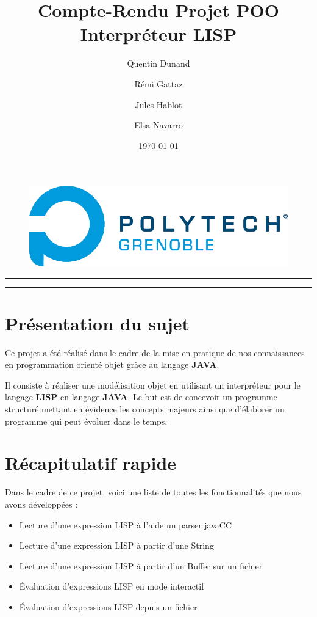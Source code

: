 \documentclass[a4paper, 11pt]{article}
\title {\Huge Compte-Rendu Projet POO \\ Interpréteur LISP}
\author{Quentin Dunand \and Rémi Gattaz \and Jules Hablot \and Elsa Navarro}
\date{\today}
\numberwithin{equation}{section}
\theoremstyle{definition}
\begin{document}
\maketitle	

\vspace*{3cm}

\begin{figure}[!hcb]
	\includegraphics[scale=2.7]{Illustration/Logo_polytech}
\end{figure}

\clearpage

\hrule
\tableofcontents
\vspace*{5mm}
\hrule

\newpage


\section{Présentation du sujet}

Ce projet a été réalisé dans le cadre de la mise en pratique de nos connaissances en programmation orienté objet grâce au langage {\bfseries JAVA}.

Il consiste à réaliser une modélisation objet en utilisant un interpréteur pour le langage {\bfseries LISP} en langage {\bfseries JAVA}. Le but est de concevoir un programme structuré mettant en évidence les concepts majeurs ainsi que d'élaborer un programme qui peut évoluer dans le temps.

  
\section{Récapitulatif rapide}

Dans le cadre de ce projet, voici une liste de toutes les fonctionnalités que nous avons développées :
\begin{itemize}
	\item Lecture d'une expression LISP à l'aide un parser javaCC
	\item Lecture d'une expression LISP à partir d'une String
	\item Lecture d'une expression LISP à partir d'un Buffer sur un fichier
	\item Évaluation d'expressions LISP en mode interactif
	\item Évaluation d'expressions LISP depuis un fichier
\end{itemize}
\vspace{3 mm}
\end{document}
